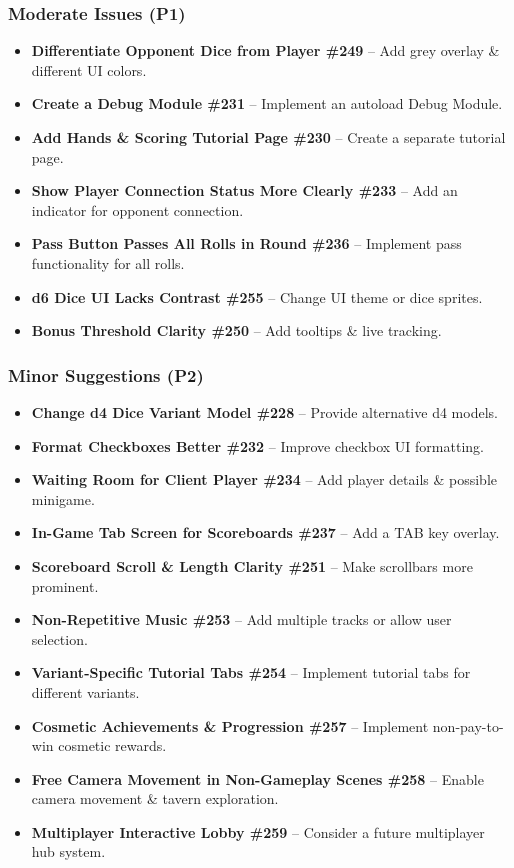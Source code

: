 \documentclass[12pt, titlepage]{article}
\begin{document}
\subsubsection{Moderate Issues (P1)}
\begin{itemize}
    \item \textbf{Differentiate Opponent Dice from Player \#249} – Add grey overlay \& different UI colors.
    \item \textbf{Create a Debug Module \#231} – Implement an autoload Debug Module.
    \item \textbf{Add Hands \& Scoring Tutorial Page \#230} – Create a separate tutorial page.
    \item \textbf{Show Player Connection Status More Clearly \#233} – Add an indicator for opponent connection.
    \item \textbf{Pass Button Passes All Rolls in Round \#236} – Implement pass functionality for all rolls.
    \item \textbf{d6 Dice UI Lacks Contrast \#255} – Change UI theme or dice sprites.
    \item \textbf{Bonus Threshold Clarity \#250} – Add tooltips \& live tracking.
\end{itemize}

\subsubsection{Minor Suggestions (P2)}
\begin{itemize}
    \item \textbf{Change d4 Dice Variant Model \#228} – Provide alternative d4 models.
    \item \textbf{Format Checkboxes Better \#232} – Improve checkbox UI formatting.
    \item \textbf{Waiting Room for Client Player \#234} – Add player details \& possible minigame.
    \item \textbf{In-Game Tab Screen for Scoreboards \#237} – Add a TAB key overlay.
    \item \textbf{Scoreboard Scroll \& Length Clarity \#251} – Make scrollbars more prominent.
    \item \textbf{Non-Repetitive Music \#253} – Add multiple tracks or allow user selection.
    \item \textbf{Variant-Specific Tutorial Tabs \#254} – Implement tutorial tabs for different variants.
    \item \textbf{Cosmetic Achievements \& Progression \#257} – Implement non-pay-to-win cosmetic rewards.
    \item \textbf{Free Camera Movement in Non-Gameplay Scenes \#258} – Enable camera movement \& tavern exploration.
    \item \textbf{Multiplayer Interactive Lobby \#259} – Consider a future multiplayer hub system.
\end{itemize}
\end{document}

